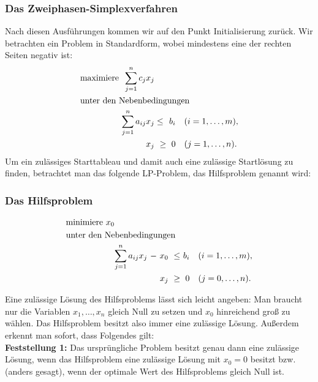 \documentclass[smaller]{beamer}
\begin{document}
\begin{frame}
 \frametitle{Das Zweiphasen-Simplexverfahren}
 Nach diesen Ausführungen kommen wir auf den Punkt Initialisierung zurück.
 Wir betrachten ein Problem in Standardform, wobei mindestens eine der rechten Seiten negativ ist:
\begin{align*}
\begin{alignedat}{4}
& \text{maximiere } & \sum\limits_{j=1}^{n}{c_jx_j} & & \\
& \rlap{unter den Nebenbedingungen} & & &\\
&& \sum\limits_{j=1}^{n}{a_{ij}x_j} & \leq &\ b_i & \quad (i=1,\ldots,m), \\
&& x_j &\ \geq &\ 0 & \quad(j=1,\ldots,n).
\end{alignedat}
\end{align*}
Um ein zulässiges Starttableau und damit auch eine zulässige Startlösung zu finden, betrachtet man das folgende LP-Problem, das \alert{Hilfsproblem} genannt wird:
\end{frame}

\begin{frame}
 \frametitle{Das Hilfsproblem}
 \begin{align*}
\begin{alignedat}{5}
& \text{minimiere $x_0$} & & & & & \\
& \rlap{unter den Nebenbedingungen} & & & & & \\
&& \sum\limits_{j=1}^{n}{a_{ij}x_j} &\ - &\ x_0 &\ \leq &\ b_i & \quad (i=1,\ldots,m), \\
&&                                  &    &\ x_j &\ \geq &\   0 & \quad(j=0,\ldots,n).
\end{alignedat}
\end{align*}

Eine zulässige Lösung des Hilfsproblems lässt sich leicht angeben: Man braucht nur die Variablen $x_1,\ldots,x_n$ gleich Null zu setzen und $x_0$ hinreichend groß zu wählen. \alert{Das Hilfsproblem besitzt also immer eine zulässige Lösung}. Außerdem erkennt man sofort, dass Folgendes gilt:\\ \vspace*{0.2cm}
\textbf{Feststellung 1:}
Das ursprüngliche Problem besitzt genau dann eine zulässige Lösung, wenn das Hilfsproblem eine zulässige Lösung mit $x_0=0$ besitzt bzw. (anders gesagt), wenn der optimale Wert des Hilfsproblems gleich Null ist.
\end{frame}
\end{document}
